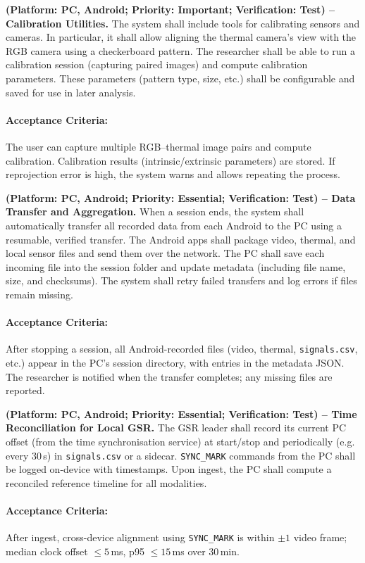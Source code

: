 \documentclass{report}
\begin{document}
\begin{description}[leftmargin=0cm]
        \item \textbf{(Platform: PC, Android; Priority: Important; Verification: Test) – Calibration Utilities.} The system shall include tools for calibrating sensors and cameras. In particular, it shall allow aligning the thermal camera’s view with the RGB camera using a checkerboard pattern. The researcher shall be able to run a calibration session (capturing paired images) and compute calibration parameters. These parameters (pattern type, size, etc.) shall be configurable and saved for use in later analysis.
        \paragraph{Acceptance Criteria:} The user can capture multiple RGB–thermal image pairs and compute calibration. Calibration results (intrinsic/extrinsic parameters) are stored. If reprojection error is high, the system warns and allows repeating the process.

        \item \textbf{(Platform: PC, Android; Priority: Essential; Verification: Test) – Data Transfer and Aggregation.} When a session ends, the system shall automatically transfer all recorded data from each Android to the PC using a resumable, verified transfer. The Android apps shall package video, thermal, and local sensor files and send them over the network. The PC shall save each incoming file into the session folder and update metadata (including file name, size, and checksums). The system shall retry failed transfers and log errors if files remain missing.
        \paragraph{Acceptance Criteria:} After stopping a session, all Android-recorded files (video, thermal, \texttt{signals.csv}, etc.) appear in the PC’s session directory, with entries in the metadata JSON. The researcher is notified when the transfer completes; any missing files are reported.

        \item \textbf{(Platform: PC, Android; Priority: Essential; Verification: Test) – Time Reconciliation for Local GSR.} The GSR leader shall record its current PC offset (from the time synchronisation service) at start/stop and periodically (e.g. every 30\,s) in \texttt{signals.csv} or a sidecar. \texttt{SYNC\_MARK} commands from the PC shall be logged on-device with timestamps. Upon ingest, the PC shall compute a reconciled reference timeline for all modalities.
        \paragraph{Acceptance Criteria:} After ingest, cross-device alignment using \texttt{SYNC\_MARK} is within $\pm 1$ video frame; median clock offset $\leq 5$\,ms, p95 $\leq 15$\,ms over 30\,min.
    \end{description}
\end{document}
